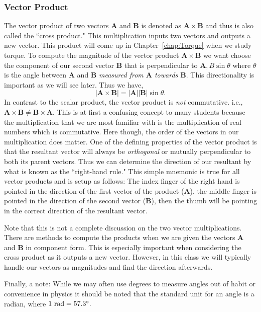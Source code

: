 \documentclass[main.tex]{subfiles}
\begin{document}
\subsubsection*{Vector Product}
The vector product of two vectors $\mathbf{A}$ and $\mathbf{B}$ is denoted as $\mathbf{A}\times\mathbf{B}$ and thus is also called the ``cross product." This multiplication inputs two vectors and outputs a new vector. This product will come up in Chapter~\ref{chap:Torque} when we study torque. To compute the magnitude of the vector product $\mathbf{A}\times\mathbf{B}$ we want choose the component of our second vector $\mathbf{B}$ that is perpendicular to $\mathbf{A}, B\sin\theta$ where $\theta$ is the angle between $\mathbf{A}$ and $\mathbf{B}$ \emph{measured from $\mathbf{A}$ towards $\mathbf{B}$}. This directionality is important as we will see later. Thus we have,
\begin{equation}
|\mathbf{A}\times\mathbf{B}|=|\mathbf{A}||\mathbf{B}|\sin\theta.
\end{equation}
In contrast to the scalar product, the vector product is \emph{not} commutative. i.e., $\mathbf{A}\times\mathbf{B}\neq\mathbf{B}\times\mathbf{A}.$ This is at first a confusing concept to many students because the multiplication that we are most familiar with is the multiplication of real numbers which is commutative. Here though, the order of the vectors in our multiplication does matter. One of the defining properties of the vector product is that the resultant vector will always be \emph{orthogonal} or mutually perpendicular to both its parent vectors. Thus we can determine the direction of our resultant by what is known as the ``right-hand rule." This simple mnemonic is true for all vector products and is setup as follows: The index finger of the right hand is pointed in the direction of the first vector of the product ($\mathbf{A}$), the middle finger is pointed in the direction of the second vector ($\mathbf{B}$), then the thumb will be pointing in the correct direction of the resultant vector.

Note that this is not a complete discussion on the two vector multiplications. There are methods to compute the products when we are given the vectors $\mathbf{A}$ and $\mathbf{B}$ in component form. This is especially important when considering the cross product as it outputs a new vector. However, in this class we will typically handle our vectors as magnitudes and find the direction afterwards.

Finally, a note: While we may often use degrees to measure angles out of habit or convenience in physics it should be noted that the standard unit for an angle is a radian, where $1\text{ rad} = 57.3\degree.$
\FloatBarrier
\end{document}
